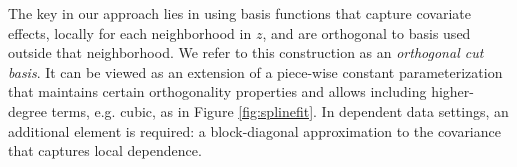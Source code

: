 The key in our approach lies in using basis functions that capture covariate effects, locally for each neighborhood in $z$,
and are orthogonal to basis used outside that neighborhood. We refer to this construction as an {\it orthogonal cut basis}. It can be viewed as an extension of a piece-wise constant parameterization that maintains certain orthogonality properties and allows including higher-degree terms, e.g. cubic, as in Figure \ref{fig:splinefit}. In dependent data settings, an additional element is required: a block-diagonal approximation to the covariance that captures local dependence. %

